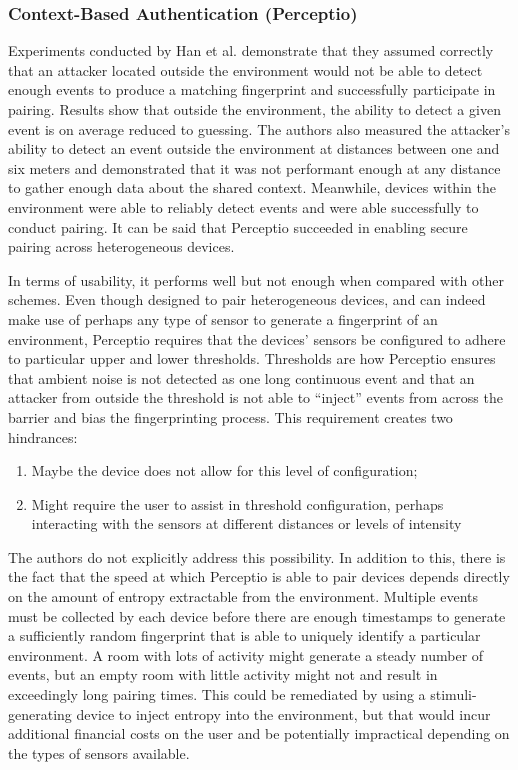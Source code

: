 \documentclass[10pt,twocolumn,letterpaper]{article}
\begin{document}
\subsubsection{Context-Based Authentication (Perceptio)}

Experiments conducted by Han et al. \cite{perceptio} demonstrate that they assumed correctly that an attacker located outside the environment would not be able to detect enough events to produce a matching fingerprint and successfully participate in pairing. Results show that outside the environment, the ability to detect a given event is on average reduced to guessing. The authors also measured the attacker’s ability to detect an event outside the environment at distances between one and six meters and demonstrated that it was not performant enough at any distance to gather enough data about the shared context. Meanwhile, devices within the environment were able to reliably detect events and were able successfully to conduct pairing. It can be said that Perceptio succeeded in enabling secure pairing across heterogeneous devices.

In terms of usability, it performs well but not enough when compared with other schemes. Even though designed to pair heterogeneous devices, and can indeed make use of perhaps any type of sensor to generate a fingerprint of an environment, Perceptio requires that the devices’ sensors be configured to adhere to particular upper and lower thresholds. Thresholds are how Perceptio ensures that ambient noise is not detected as one long continuous event and that an attacker from outside the threshold is not able to “inject” events from across the barrier and bias the fingerprinting process. This requirement creates two hindrances:

\begin{enumerate}
    \item Maybe the device does not allow for this level of configuration;
    \item Might require the user to assist in threshold configuration, perhaps interacting with the sensors at different distances or levels of intensity
\end{enumerate}

The authors do not explicitly address this possibility. In addition to this, there is the fact that the speed at which Perceptio is able to pair devices depends directly on the amount of entropy extractable from the environment. Multiple events must be collected by each device before there are enough timestamps to generate a sufficiently random fingerprint that is able to uniquely identify a particular environment. A room with lots of activity might generate a steady number of events, but an empty room with little activity might not and result in exceedingly long pairing times. This could be remediated by using a stimuli-generating device to inject entropy into the environment, but that would incur additional financial costs on the user and be potentially impractical depending on the types of sensors available.
\end{document}
